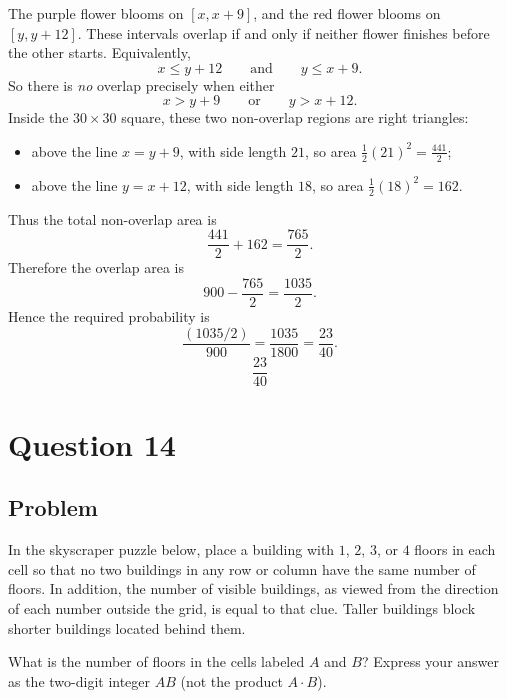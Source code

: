 \documentclass[12pt]{article}
\begin{document}
The purple flower blooms on $[x,x+9]$, and the red flower blooms on $[y,y+12]$. These intervals overlap if and only if neither flower finishes before the other starts. Equivalently,
\[
x \le y+12
\qquad\text{and}\qquad
y \le x+9.
\]
So there is \emph{no} overlap precisely when either
\[
x > y+9
\qquad\text{or}\qquad
y > x+12.
\]
Inside the $30\times 30$ square, these two non-overlap regions are right triangles:
\begin{itemize}
    \item above the line $x=y+9$, with side length $21$, so area $\frac12(21)^2=\frac{441}{2}$;
    \item above the line $y=x+12$, with side length $18$, so area $\frac12(18)^2=162$.
\end{itemize}
Thus the total non-overlap area is
\[
\frac{441}{2}+162=\frac{765}{2}.
\]
Therefore the overlap area is
\[
900-\frac{765}{2}=\frac{1035}{2}.
\]
Hence the required probability is
\[
\frac{(1035/2)}{900}=\frac{1035}{1800}=\frac{23}{40}.
\]
\[
\boxed{\frac{23}{40}}
\]

\newpage
\section{Question 14}
\subsection{Problem}
In the skyscraper puzzle below, place a building with $1$, $2$, $3$, or $4$ floors in each cell so that no two buildings in any row or column have the same number of floors. In addition, the number of visible buildings, as viewed from the direction of each number outside the grid, is equal to that clue. Taller buildings block shorter buildings located behind them.

What is the number of floors in the cells labeled $A$ and $B$? Express your answer as the two-digit integer $AB$ (not the product $A \cdot B$).
\end{document}
